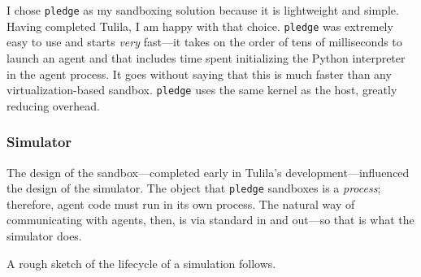 \documentclass[12pt]{article}
\begin{document}
I chose \texttt{pledge} as my sandboxing solution because it is lightweight and simple. Having completed Tulila, I am happy with that choice. \texttt{pledge} was extremely easy to use and starts \textit{very} fast---it takes on the order of tens of milliseconds to launch an agent and that includes time spent initializing the Python interpreter in the agent process. It goes without saying that this is much faster than any virtualization-based sandbox. \texttt{pledge} uses the same kernel as the host, greatly reducing overhead.

\subsubsection{Simulator}
\label{section:simulator}

The design of the sandbox---completed early in Tulila's development---influenced the design of the simulator. The object that \texttt{pledge} sandboxes is a \textit{process}; therefore, agent code must run in its own process. The natural way of communicating with agents, then, is via standard in and out---so that is what the simulator does.

A rough sketch of the lifecycle of a simulation follows.
\end{document}
